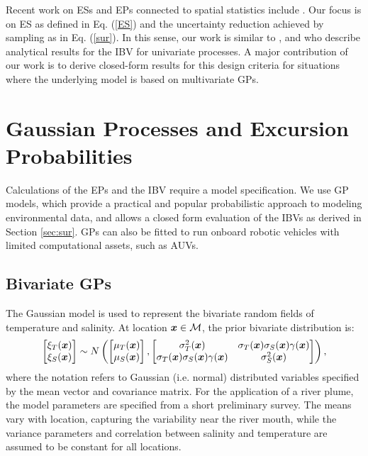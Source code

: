 \documentclass[aoas]{imsart}
\begin{document}
Recent work on ESs and EPs connected to spatial statistics include
\cite{picheny2010,french2013spatio,bolin2015excursion,french2016credible}.
Our focus is on ES as defined in Eq. (\ref{ES}) and the uncertainty
reduction achieved by sampling as in Eq. (\ref{sur}). In this sense,
our work is similar to \cite{bect2012}, \cite{chevalier2014fast} and
\cite{azzimonti2016quantifying} who describe analytical results for
the IBV for univariate processes. A major contribution of our work is
to derive closed-form results for this design criteria for situations
where the underlying model is based on multivariate GPs.

\section{Gaussian Processes and Excursion Probabilities}
\label{sec:GP_EP}

Calculations of the EPs and the IBV require a model specification. We
use GP models, which provide a practical and popular probabilistic
approach to modeling environmental data, and allows a closed form
evaluation of the IBVs as derived in Section \ref{sec:sur}. GPs can
also be fitted to run onboard robotic vehicles with limited
computational assets, such as AUVs.

\subsection{Bivariate GPs}

The Gaussian model is used to represent the bivariate random fields of
temperature and salinity. At location ${\boldsymbol x} \in \mathcal{M}$, the prior
bivariate distribution is:
\begin{equation}\label{gp_bar}
  \begin{bmatrix}\xi_T(\bx) \\
    \xi_S(\bx) \end{bmatrix}
 \sim N \left( 
\begin{bmatrix} \mu_{T}(\bx)\\
\mu_{S}(\bx)
\end{bmatrix},\begin{bmatrix}
\sigma_{T}^2(\bx) & \sigma_{T}(\bx) \sigma_S(\bx) \gamma(\bx)  \\
\sigma_{T}(\bx) \sigma_S(\bx) \gamma(\bx)  & \sigma_{S}^2(\bx) 
\end{bmatrix}
\right),
\end{equation}
where the notation refers to Gaussian (i.e. normal) distributed
variables specified by the mean vector and covariance matrix. For the
application of a river plume, the model parameters are specified from
a short preliminary survey. The means vary with location, capturing
the variability near the river mouth, while the variance parameters
and correlation between salinity and temperature are assumed to be
constant for all locations. %
\end{document}
